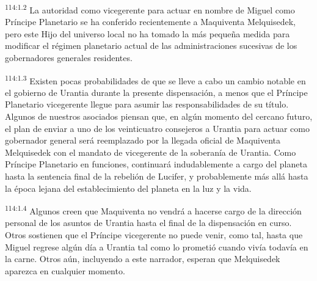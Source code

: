 \par
\textsuperscript{114:1.2} La autoridad como vicegerente para actuar en nombre de Miguel como Príncipe Planetario se ha conferido recientemente a Maquiventa Melquisedek, pero este Hijo del universo local no ha tomado la más pequeña medida para modificar el régimen planetario actual de las administraciones sucesivas de los gobernadores generales residentes.

\par
\textsuperscript{114:1.3} Existen pocas probabilidades de que se lleve a cabo un cambio notable en el gobierno de Urantia durante la presente dispensación, a menos que el Príncipe Planetario vicegerente llegue para asumir las responsabilidades de su título. Algunos de nuestros asociados piensan que, en algún momento del cercano futuro, el plan de enviar a uno de los veinticuatro consejeros a Urantia para actuar como gobernador general será reemplazado por la llegada oficial de Maquiventa Melquisedek con el mandato de vicegerente de la soberanía de Urantia. Como Príncipe Planetario en funciones, continuará indudablemente a cargo del planeta hasta la sentencia final de la rebelión de Lucifer, y probablemente más allá hasta la época lejana del establecimiento del planeta en la luz y la vida.

\par
\textsuperscript{114:1.4} Algunos creen que Maquiventa no vendrá a hacerse cargo de la dirección personal de los asuntos de Urantia hasta el final de la dispensación en curso. Otros sostienen que el Príncipe vicegerente no puede venir, como tal, hasta que Miguel regrese algún día a Urantia tal como lo prometió cuando vivía todavía en la carne. Otros aún, incluyendo a este narrador, esperan que Melquisedek aparezca en cualquier momento.

